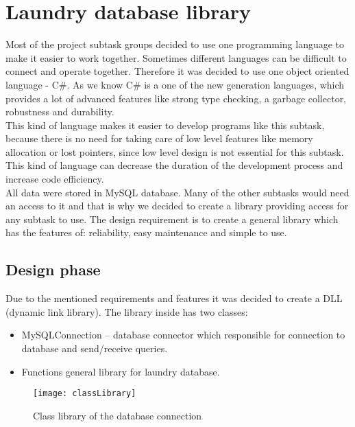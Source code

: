 %
\section{Laundry database library}

Most of the project subtask groups decided to use one programming language to make it easier to work together. Sometimes different languages can be difficult to connect and operate together. Therefore it was decided to use one object oriented language - C\#. As we know C\# is a one of the new generation languages, which provides a lot of advanced features like strong type checking, a garbage collector, robustness and durability. \\ This kind of language makes it easier to develop programs like this subtask, because there is no need for taking care of low level features like memory allocation or lost pointers, since low level design is not essential for this subtask. This kind of language can decrease the duration of the development process and increase code efficiency. \\

All data were stored in MySQL database. Many of the other subtasks would need an access to it and that is why we decided to create a library providing access for any subtask to use. The design requirement is to create a general library which has the features of:  reliability, easy maintenance and simple to use.

\subsection{Design phase}

Due to the mentioned requirements and features it was decided to create a DLL (dynamic link library). The library inside has two classes:

\begin{itemize}
	\item MySQLConnection – database connector which responsible for connection to database and send/receive queries.
	\item Functions \textendash general library for laundry database.
\end{itemize}

\begin{figure}[h]
	\centering
		\texttt{[image: classLibrary]}
	\caption{Class library of the database connection}
	\label{fig:planning}
\end{figure}

\newpage
